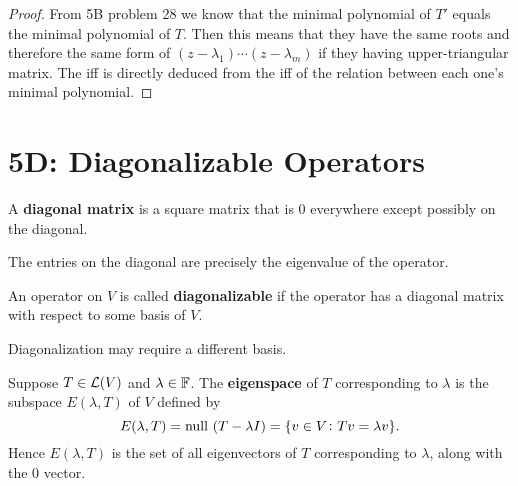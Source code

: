 \documentclass{extarticle}
\begin{document}
\begin{proof}
From 5B problem 28 we know that the minimal polynomial of \(T'\) equals the minimal polynomial of \(T\). 
Then this means that they have the same roots and therefore the same form of \((z - \lambda_1) 
\cdots (z - \lambda_m)\) if they having upper-triangular matrix. The iff is directly deduced from the iff 
of the relation between each one's minimal polynomial.
\end{proof}


\newpage 
\section*{5D: Diagonalizable Operators}

\begin{definition}
    A \textbf{diagonal matrix} is a square matrix that is 0 everywhere except possibly on the 
    diagonal.    
\end{definition}

\begin{remark}
    The entries on the diagonal are precisely the eigenvalue of the operator.
\end{remark}

\begin{definition}[diagonalizable]
    An operator on \(V\) is called \textbf{diagonalizable} if the operator has a diagonal matrix 
    with respect to some basis of \(V\).
\end{definition}

\begin{remark}
    Diagonalization may require a different basis.
\end{remark}

\begin{definition}
    Suppose \(T \in \mathcal{L}(V)\) and \(\lambda \in \mathbb{F}\). The \textbf{eigenspace} of \(T\) corresponding to 
    \(\lambda\) is the subspace \(E (\lambda, T)\) of \(V\) defined by 
    \[E(\lambda, T) = \text{null } (T - \lambda I) = \{v \in V \colon Tv = \lambda v\}.\]
    Hence \(E(\lambda, T)\) is the set of all eigenvectors of \(T\) corresponding to \(\lambda\), along 
    with the 0 vector. 
\end{definition}
\end{document}

